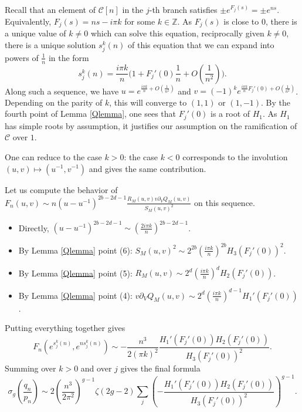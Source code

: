 \documentclass{amsart}
\newcommand{\Z}{\mathbb{Z}}
\newcommand{\calC}{\mathcal{C}}
\theoremstyle{definition}
\begin{document}
Recall that an element of $\calC[n]$ in the $j$-th branch satisfies $\pm e^{F_j(s)}=\pm e^{ns}$. Equivalently, $F_j(s)=ns-i\pi k$ for some $k\in \Z$. As $F_j(s)$ is close to $0$, there is a unique value of $k\ne 0$ which can solve this equation, reciprocally given $k\ne 0$, there is a unique solution $s_j^k(n)$ of this equation that we can expand into powers of $\frac{1}{n}$ in the form 
$$s_j^k(n)=\frac{i\pi k}{n}\Big(1+F_j'(0)\frac{1}{n}+O(\frac{1}{n^2})\Big).$$
Along such a sequence, we have $u=e^{\frac{i\pi k}{n}+O(\frac{1}{n^2})}$ and $v=(-1)^ke^{\frac{i\pi k }{n}F_j'(0)+O(\frac{1}{n^2})}$. Depending on the parity of $k$, this will converge to $(1,1)$ or $(1,-1)$. 
By the fourth point of Lemma \ref{Qlemma}, one sees that $F_j'(0)$ is a root of $H_1$. As $H_1$ has simple roots by assumption, it justifies our assumption on the ramification of $\calC$ over $1$. 

One can reduce to the case $k>0$: the case $k<0$ corresponds to the involution $(u,v)\mapsto (u^{-1},v^{-1})$ and gives the same contribution. 

Let us compute the behavior of $F_n(u,v)\sim n(u-u^{-1})^{2b-2d-1}\frac{R_M(u,v)v\partial_VQ_M(u,v)}{S_M(u,v)^2}$ on this sequence. 
\begin{itemize}
\item[-] Directly, $(u-u^{-1})^{2b-2d-1}\sim (\frac{2i\pi k}{n})^{2b-2d-1}$.
\item[-] By Lemma \ref{Qlemma} point (6): $S_M(u,v)^2\sim 2^{2b} (\frac{i\pi k}{n})^{2b} H_3(F_j'(0))^2$.
\item[-] By Lemma \ref{Qlemma} point (5): $R_M(u,v)\sim 2^d (\frac{i\pi k}{n})^dH_2(F_j'(0))$.
\item[-] By Lemma \ref{Qlemma} point (4): $v\partial_V Q_M(u,v)\sim 2^d(\frac{i\pi k}{n})^{d-1}H_1'(F_j'(0))$.
\end{itemize}
Putting everything together gives 
$$F_n(e^{s_j^k(n)},e^{ns_j^k(n)})\sim -\frac{n^3}{2(\pi k)^2}\frac{H_1'(F_j'(0))H_2(F_j'(0))}{H_3(F_j'(0))^2}.$$
Summing over $k>0$ and over $j$ gives the final formula
$$\sigma_g \left(\frac{q_n}{p_n}\right)\sim 2\left(\frac{n^3}{2\pi^2}\right)^{g-1} \!\!\zeta(2g-2)\sum_{j}\left(-\frac{H_1'(F_j'(0))H_2(F_j'(0))}{H_3(F_j'(0))^2}\right)^{g-1} .$$
\end{document}
